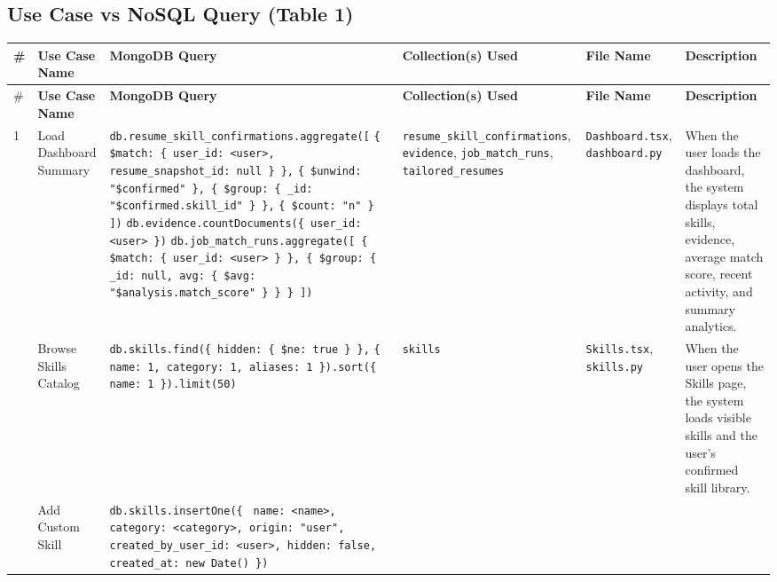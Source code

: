 \documentclass[11pt]{article}
\begin{document}
\subsection{Use Case vs NoSQL Query (Table 1)}
\renewcommand{\arraystretch}{1.15}
\begin{landscape}
\scriptsize
\begin{longtable}{@{}p{0.28in}p{1.15in}p{3.3in}p{1.25in}p{1.35in}p{1.9in}@{}}
\toprule
\# & \textbf{Use Case Name} & \textbf{MongoDB Query} & \textbf{Collection(s) Used} & \textbf{File Name} & \textbf{Description} \\
\midrule
\endfirsthead
\toprule
\# & \textbf{Use Case Name} & \textbf{MongoDB Query} & \textbf{Collection(s) Used} & \textbf{File Name} & \textbf{Description} \\
\midrule
\endhead
1 &
Load Dashboard Summary &
\texttt{db.resume\_skill\_confirmations.aggregate([} \newline
\texttt{\{ \$match: \{ user\_id: <user>, resume\_snapshot\_id: null \} \},} \newline
\texttt{\{ \$unwind: "\$confirmed" \}, \{ \$group: \{ \_id: "\$confirmed.skill\_id" \} \},} \newline
\texttt{\{ \$count: "n" \} ])} \newline
\texttt{db.evidence.countDocuments(\{ user\_id: <user> \})} \newline
\texttt{db.job\_match\_runs.aggregate([ \{ \$match: \{ user\_id: <user> \} \}, \{ \$group: \{ \_id: null, avg: \{ \$avg: "\$analysis.match\_score" \} \} \} ])} &
\texttt{resume\_skill\_confirmations}, \texttt{evidence}, \texttt{job\_match\_runs}, \texttt{tailored\_resumes} &
\texttt{Dashboard.tsx}, \texttt{dashboard.py} &
When the user loads the dashboard, the system displays total skills, evidence, average match score, recent activity, and summary analytics. \\
\addlinespace
2 &
Browse Skills Catalog &
\texttt{db.skills.find(\{ hidden: \{ \$ne: true \} \},} \newline
\texttt{\{ name: 1, category: 1, aliases: 1 \}).sort(\{ name: 1 \}).limit(50)} &
\texttt{skills} &
\texttt{Skills.tsx}, \texttt{skills.py} &
When the user opens the Skills page, the system loads visible skills and the user's confirmed skill library. \\
\addlinespace
3 &
Add Custom Skill &
\texttt{db.skills.insertOne(\{} \newline
\texttt{ name: <name>, category: <category>, origin: "user",} \newline
\texttt{ created\_by\_user\_id: <user>, hidden: false, created\_at: new Date() \})} &

\end{longtable}
\end{landscape}
\end{document}
